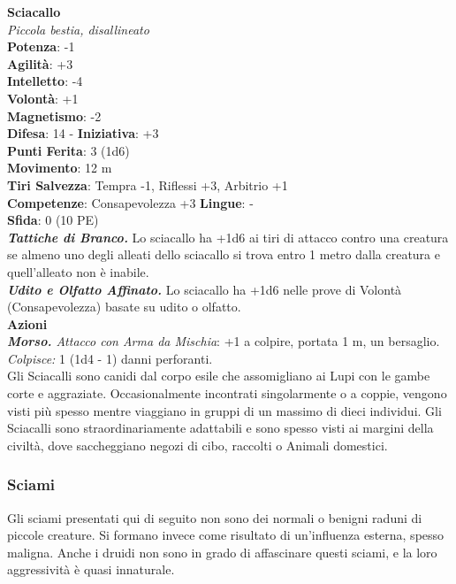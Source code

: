 \begin{multicols}{2}
\medskip\textbf{Sciacallo}\\
\emph{Piccola bestia, disallineato}\\
\textbf{Potenza}: -1\\
\textbf{Agilità}: +3\\
\textbf{Intelletto}: -4\\
\textbf{Volontà}: +1\\
\textbf{Magnetismo}: -2\\
\textbf{Difesa}: 14 - \textbf{Iniziativa}: +3\\
\textbf{Punti Ferita}: 3 (1d6)\\
\textbf{Movimento}: 12 m\\
\textbf{Tiri Salvezza}: Tempra -1, Riflessi +3, Arbitrio +1\\
\textbf{Competenze}: Consapevolezza +3
\textbf{Lingue}: -\\
\textbf{Sfida}: 0 (10 PE)\smallskip\\
\emph{\textbf{Tattiche di Branco.}} Lo sciacallo ha +1d6 ai tiri di attacco contro una creatura se almeno uno degli alleati dello sciacallo si trova entro 1 metro dalla creatura e quell'alleato non è inabile.\\
\emph{\textbf{Udito e Olfatto Affinato.}} Lo sciacallo ha +1d6 nelle prove di Volontà (Consapevolezza) basate su udito o olfatto.\\
\smallskip\textbf{Azioni}\\
\emph{\textbf{Morso.} Attacco con Arma da Mischia}: +1 a colpire, portata 1 m, un bersaglio.\\
\emph{Colpisce:} 1 (1d4 - 1) danni perforanti.\\
Gli Sciacalli sono canidi dal corpo esile che assomigliano ai Lupi con le gambe corte e aggraziate. Occasionalmente incontrati singolarmente o a coppie, vengono visti più spesso mentre viaggiano in gruppi di un massimo di dieci individui. Gli Sciacalli sono straordinariamente adattabili e sono spesso visti ai margini della civiltà, dove saccheggiano negozi di cibo, raccolti o Animali domestici.\\

\subsubsection{Sciami}

Gli sciami presentati qui di seguito non sono dei normali o benigni raduni di piccole creature. Si formano invece come risultato di un'influenza esterna, spesso maligna. Anche i druidi non sono in grado di affascinare questi sciami, e la loro aggressività è quasi innaturale.\\


\end{multicols}
